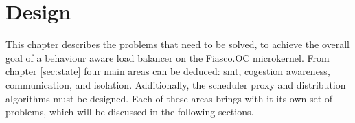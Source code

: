 \chapter{Design}
\label{sec:design}




This chapter describes the problems that need to be solved, to achieve the
overall goal of a behaviour aware load balancer on the Fiasco.OC microkernel.
From chapter \ref{sec:state} four main areas can be deduced: \gls{smt},
cogestion awareness, communication, and isolation.
Additionally, the scheduler proxy and distribution algorithms must be designed.
Each of these areas brings with it its own set of problems, which will be
discussed in the following sections.








